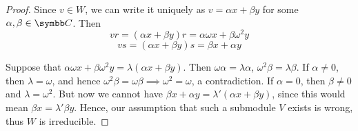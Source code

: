 \begin{proof}
Since \(v \in W\), we can write it uniquely as \(v = \alpha x + \beta y\) for some \(\alpha, \beta \in \complex\). Then
\[
    v r = (\alpha x + \beta y) r = \alpha \omega x + \beta \omega^2 y
\]
\[
    vs = (\alpha x + \beta y) s = \beta x + \alpha y
\]

Suppose that \(\alpha \omega x + \beta \omega^2 y = \lambda(\alpha x + \beta y)\). Then \(\omega \alpha = \lambda \alpha\), \(\omega^2 \beta = \lambda \beta\). If \(\alpha \neq 0\), then \(\lambda = \omega\), and hence \(\omega^2 \beta = \omega \beta \implies \omega^2 = \omega\), a contradiction. If \(\alpha = 0\), then \(\beta \neq 0\) and \(\lambda = \omega^2\). But now we cannot have \(\beta x + \alpha y = \lambda' (\alpha x + \beta y)\), since this would mean \(\beta x = \lambda' \beta y\). Hence, our assumption that such a submodule \(V\) exists is wrong, thus \(W\) is irreducible.
\end{proof}

